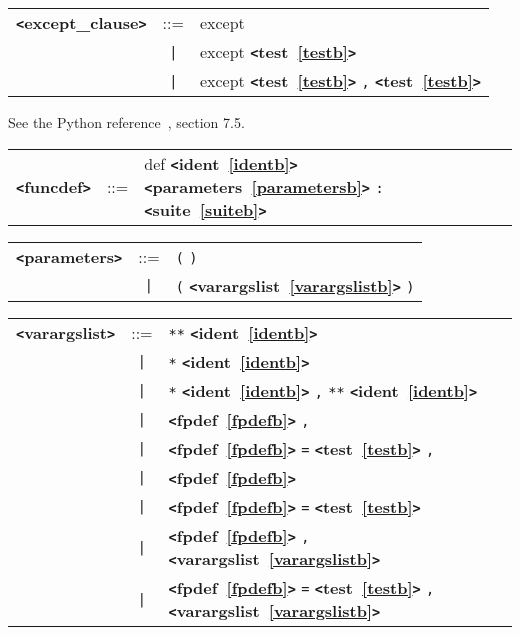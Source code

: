 \label{exceptzzzclauseb}
\begin{tabular}{lcl}
{\bf \verb+<+except\_clause\verb+>+} & ::=  & except \\
 & \verb+|+  & except {\bf \verb+<+test~\ref{testb}\verb+>+}  \\
 & \verb+|+  & except {\bf \verb+<+test~\ref{testb}\verb+>+}  \verb|,| {\bf \verb+<+test~\ref{testb}\verb+>+}  \\
\end{tabular}

\label{funcdefb}

See the Python reference~\cite{pythonlang}, section 7.5.

\begin{tabular}{lcl}
{\bf \verb+<+funcdef\verb+>+} & ::=  & def {\bf \verb+<+ident~\ref{identb}\verb+>+}  {\bf \verb+<+parameters~\ref{parametersb}\verb+>+}  \verb|:| {\bf \verb+<+suite~\ref{suiteb}\verb+>+}  \\
\end{tabular}

\label{parametersb}
\begin{tabular}{lcl}
{\bf \verb+<+parameters\verb+>+} & ::=  & \verb|(| \verb|)| \\
 & \verb+|+  & \verb|(| {\bf \verb+<+varargslist~\ref{varargslistb}\verb+>+}  \verb|)| \\
\end{tabular}

\label{varargslistb}
\begin{tabular}{lcl}
{\bf \verb+<+varargslist\verb+>+} & ::=  & \verb|**| {\bf \verb+<+ident~\ref{identb}\verb+>+}  \\
 & \verb+|+  & \verb|*| {\bf \verb+<+ident~\ref{identb}\verb+>+}  \\
 & \verb+|+  & \verb|*| {\bf \verb+<+ident~\ref{identb}\verb+>+}  \verb|,| \verb|**| {\bf \verb+<+ident~\ref{identb}\verb+>+}  \\
 & \verb+|+  & {\bf \verb+<+fpdef~\ref{fpdefb}\verb+>+}  \verb|,| \\
 & \verb+|+  & {\bf \verb+<+fpdef~\ref{fpdefb}\verb+>+}  \verb|=| {\bf \verb+<+test~\ref{testb}\verb+>+}  \verb|,| \\
 & \verb+|+  & {\bf \verb+<+fpdef~\ref{fpdefb}\verb+>+}  \\
 & \verb+|+  & {\bf \verb+<+fpdef~\ref{fpdefb}\verb+>+}  \verb|=| {\bf \verb+<+test~\ref{testb}\verb+>+}  \\
 & \verb+|+  & {\bf \verb+<+fpdef~\ref{fpdefb}\verb+>+}  \verb|,| {\bf \verb+<+varargslist~\ref{varargslistb}\verb+>+}  \\
 & \verb+|+  & {\bf \verb+<+fpdef~\ref{fpdefb}\verb+>+}  \verb|=| {\bf \verb+<+test~\ref{testb}\verb+>+}  \verb|,| {\bf \verb+<+varargslist~\ref{varargslistb}\verb+>+}  \\
\end{tabular} \\

